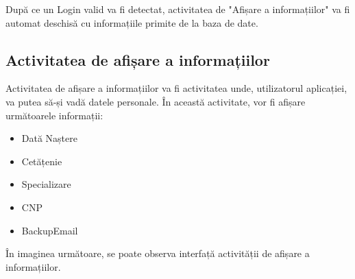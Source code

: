 \documentclass{article}
\begin{document}
		După ce un Login valid va fi detectat, activitatea de "Afișare a informațiilor" va fi automat deschisă cu informațiile primite de la baza de date.

		\subsection{Activitatea de afișare a informațiilor}

		  Activitatea de afișare a informațiilor va fi activitatea unde, utilizatorul aplicației, va putea să-și vadă datele personale. În această activitate, vor fi afișare următoarele informații:
	\begin{itemize}
		\item Dată Naștere
		\item Cetățenie
		\item Specializare
		\item CNP
		\item BackupEmail
	\end{itemize}

		În imaginea următoare, se poate observa interfață activității de afișare a informațiilor. 
\end{document}
